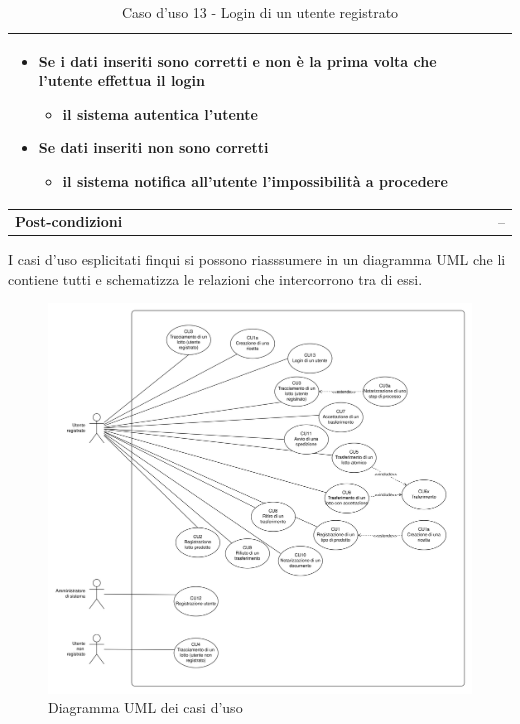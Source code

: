 \documentclass[a4paper,11pt]{article}
\begin{document}
\begin{table}[H]
\begin{tabular}{|m{2cm}|m{10.5cm}|}
\begin{itemize}
\begin{itemize}
\begin{itemize}
                    \end{itemize}
              \item Se i dati inseriti sono corretti e non è la prima volta che l'utente effettua il login
                    \begin{itemize}
                      \item il sistema autentica l'utente
                    \end{itemize}
              \item Se dati inseriti non sono corretti
                    \begin{itemize}
                      \item il sistema notifica all'utente l'impossibilità a procedere
                    \end{itemize}
            \end{itemize}
    \end{itemize}                                \\ \hline
    \multicolumn{1}{|l|}{\textbf{Post-condizioni}} & --                                                  \\ \hline
  \end{tabular}
  \caption{Caso d'uso 13 - Login di un utente registrato}
  \label{cu:CU13}
\end{table}

I casi d'uso esplicitati finqui si possono riasssumere in un diagramma UML che li contiene tutti e schematizza le relazioni che intercorrono tra di essi.

\begin{figure}[H]
  \includegraphics[width=1\linewidth]{img/umlcasi.png}
  \caption{Diagramma UML dei casi d'uso}
  \label{fig:diagrammacasi}
\end{figure}
\end{document}
